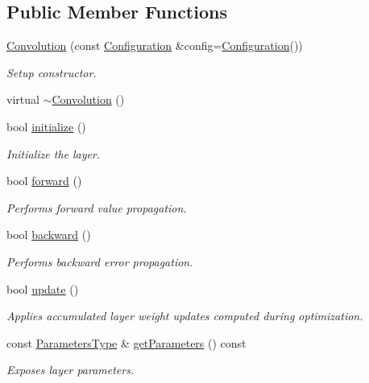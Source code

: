 \subsection*{Public Member Functions}
\begin{DoxyCompactItemize}
\item 
\hyperlink{classffnn_1_1layer_1_1_convolution_accbc6ed0e52e16e2f8d2a029d68011b5}{Convolution} (const \hyperlink{classffnn_1_1layer_1_1_convolution_1_1_configuration}{Configuration} \&config=\hyperlink{classffnn_1_1layer_1_1_convolution_1_1_configuration}{Configuration}())
\begin{DoxyCompactList}\small\item\em Setup constructor. \end{DoxyCompactList}\item 
virtual \hyperlink{classffnn_1_1layer_1_1_convolution_a82301134ee4b438304163fc62d3e800f}{$\sim$\-Convolution} ()
\item 
bool \hyperlink{classffnn_1_1layer_1_1_convolution_ab3f6d731184032f58b05651d63e22d14}{initialize} ()
\begin{DoxyCompactList}\small\item\em Initialize the layer. \end{DoxyCompactList}\item 
bool \hyperlink{classffnn_1_1layer_1_1_convolution_a5f6bf2bfc15a8020b11dabff0d03eac2}{forward} ()
\begin{DoxyCompactList}\small\item\em Performs forward value propagation. \end{DoxyCompactList}\item 
bool \hyperlink{classffnn_1_1layer_1_1_convolution_a094e10487239ea4eb043347211180f00}{backward} ()
\begin{DoxyCompactList}\small\item\em Performs backward error propagation. \end{DoxyCompactList}\item 
bool \hyperlink{classffnn_1_1layer_1_1_convolution_a66975d31de2fc164cbc9ae284f0d67f7}{update} ()
\begin{DoxyCompactList}\small\item\em Applies accumulated layer weight updates computed during optimization. \end{DoxyCompactList}\item 
const \hyperlink{classffnn_1_1layer_1_1_convolution_ad66f693126a5a4b3cc7398f3be7c22a7}{Parameters\-Type} \& \hyperlink{classffnn_1_1layer_1_1_convolution_a8c7ea1047ee3f09deadf87ad267284ab}{get\-Parameters} () const 
\begin{DoxyCompactList}\small\item\em Exposes layer parameters. \end{DoxyCompactList}\end{DoxyCompactItemize}
